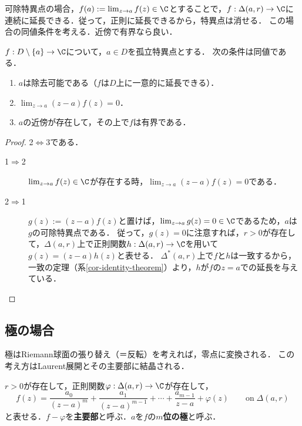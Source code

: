 \documentclass[uplatex, dvipdfmx]{jsreport}
\begin{document}
\begin{screen}
    可除特異点の場合，$f(a):=\lim_{z\to a}f(z)\in\C$とすることで，$f:\Delta(a,r)\to\C$に連続に延長できる．従って，正則に延長できるから，特異点は消せる．
    この場合の同値条件を考える．近傍で有界なら良い．
\end{screen}

\begin{theorem}\label{thm-Riemann's-removable-zeros}
    $f:D\setminus\{a\}\to\C$について，$a\in D$を孤立特異点とする．
    次の条件は同値である．
    \begin{enumerate}
        \item $a$は除去可能である（$f$は$D$上に一意的に延長できる）．
        \item $\lim_{z\to a}(z-a)f(z)=0$．
        \item $a$の近傍が存在して，その上で$f$は有界である．
    \end{enumerate}
\end{theorem}
\begin{proof}
    2$\Leftrightarrow$3である．
    \begin{description}
        \item[1$\Rightarrow$2] 
        $\lim_{z\to a}f(z)\in\C$が存在する時，$\lim_{z\to a}(z-a)f(z)=0$である．
        \item[2$\Rightarrow$1] 
        $g(z):=(z-a)f(z)$と置けば，$\lim_{z\to a}g(z)=0\in\C$であるため，$a$は$g$の可除特異点である．
        従って，$g(z)=0$に注意すれば，$r>0$が存在して，$\Delta(a,r)$上で正則関数$h:\Delta(a,r)\to\C$を用いて$g(z)=(z-a)h(z)$と表せる．
        $\Delta^*(a,r)$上で$f$と$h$は一致するから，一致の定理（系\ref{cor-identity-theorem}）より，$h$が$f$の$z=a$での延長を与えている．
    \end{description}
\end{proof}

\subsection{極の場合}

\begin{screen}
    極はRiemann球面の張り替え（＝反転）を考えれば，零点に変換される．
    この考え方はLaurent展開とその主要部に結晶される．
\end{screen}

\begin{definition}[極の主要部]
    $r>0$が存在して，正則関数$\varphi:\Delta(a,r)\to\C$が存在して，
    \[f(z)=\frac{a_0}{(z-a)^m}+\frac{a_1}{(z-a)^{m-1}}+\cdots+\frac{a_{m-1}}{z-a}+\varphi(z)\qquad\mathrm{on}\;\Delta(a,r)\]
    と表せる．$f-\varphi$を\textbf{主要部}と呼ぶ．$a$を$f$の\textbf{$m$位の極}と呼ぶ．
\end{definition}
\end{document}
